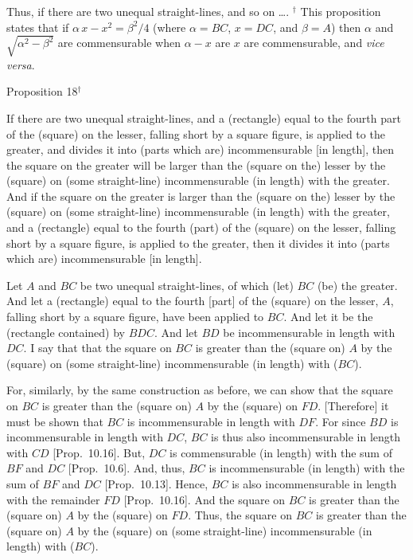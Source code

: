Thus,  if there are two unequal straight-lines, and so on \ldots.
{\footnotesize\noindent$^\dag$ This proposition states that if $\alpha\,x-x^2=\beta^2/4$ (where $\alpha=BC$, $x=DC$,
and $\beta=A$) then $\alpha$ and $\sqrt{\alpha^2-\beta^2}$ are commensurable when $\alpha-x$ are $x$ are commensurable, and {\em vice versa}.}


\begin{center}
{\large Proposition 18}$^\dag$
\end{center}

If there are two unequal straight-lines,
and a (rectangle) equal to the fourth part of the (square) on the
lesser, falling short by a square figure, is applied to the greater, and
divides it into (parts which are) incommensurable [in length], then
 the  square on the greater  will be  larger than the  (square on the) lesser  by the (square)
on (some straight-line) incommensurable  (in length) with the greater.
And if the square on the greater is larger than the (square on the) lesser  by the (square)
on (some straight-line) incommensurable  (in length) with the greater, and
a (rectangle) equal to the fourth (part) of the (square) on the lesser,
falling short by a square figure, is applied to the greater, then it divides it into (parts
which are) incommensurable [in length].

Let $A$ and $BC$ be two unequal straight-lines, of which (let) $BC$ (be) the
greater. And let a (rectangle) equal to the fourth [part] of the (square) on the
lesser, $A$, falling short by a
square figure, have been applied to $BC$. And let it be the (rectangle contained) by $BDC$. And let $BD$ be incommensurable in length with
$DC$. I say that that the square on $BC$ is greater than the (square on) $A$ by the (square) on (some straight-line) incommensurable (in length) with ($BC$).

\epsfysize=0.8in
\centerline{}

For, similarly, by the same construction as before, we can show that
the square on $BC$ is greater than the (square on) $A$ by the (square)
on $FD$. [Therefore] it must be shown that $BC$ is incommensurable
in length
with $DF$. For since $BD$ is incommensurable in length with $DC$, $BC$
is thus also incommensurable in length with $CD$ [Prop.~10.16]. But, $DC$ is commensurable (in length) with the sum of 
$BF$ and $DC$ [Prop.~10.6]. And, thus,
$BC$ is incommensurable (in  length) with the sum of $BF$ and $DC$ [Prop.~10.13]. Hence, $BC$ is also incommensurable in length with the remainder $FD$ [Prop.~10.16]. And the square on $BC$ is greater than the (square on) $A$ by the (square) on $FD$. Thus, the square on $BC$
is greater than the (square on) $A$ by the (square) on (some straight-line) incommensurable
(in length) 
with ($BC$).


